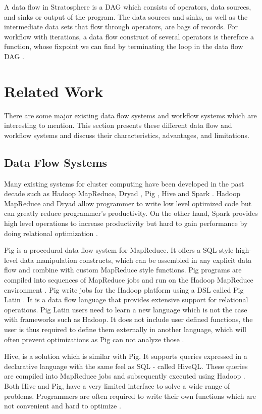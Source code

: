 A data flow in Stratosphere is a DAG which consists of operators, data sources, and sinks or output of the program. The data sources and sinks, as well as the intermediate data sets that flow through operators, are bags of records. For workflow with iterations, a data flow construct of several operators is therefore a function, whose fixpoint we can find by terminating the loop in the data flow DAG \cite{ewen2012spinning}.

\section{Related Work}\label{sec:rw}
There are some major existing data flow systems and workflow systems which are interesting to mention. This section presents these different data flow and workflow systems and discuss their characteristics, advantages, and limitations. 

\subsection{Data Flow Systems}
Many existing systems for cluster computing have been developed in the past decade such as Hadoop MapReduce, Dryad \cite{isard2007dryad}, Pig \cite{olston2008pig}, Hive \cite{thusoo2010hive} and Spark \cite{zaharia2010spark}. Hadoop MapReduce and Dryad allow programmer to write low level optimized code but can greatly reduce programmer’s productivity. On the other hand, Spark provides high level operations to increase productivity but hard to gain performance by doing relational optimization \cite{ackermann2012jet}. 

Pig is a procedural data flow system for MapReduce. It offers a SQL-style high-level data manipulation constructs, which can be assembled in any explicit data flow and combine with custom MapReduce style functions. Pig programs are compiled into sequences of MapReduce jobs and run on the Hadoop MapReduce environment \cite{gates2009building}. Pig write jobs for the Hadoop platform using a DSL called Pig Latin \cite{olston2008pig}. It is a data flow language that provides extensive support for relational operations. Pig Latin users need to learn a new language which is not the case with frameworks such as Hadoop. It does not include user defined functions, the user is thus required to define them externally in another language, which will often prevent optimizations as Pig can not analyze those \cite{ackermann2012jet}. 

Hive, is a solution which is similar with Pig. It supports queries expressed in a declarative language with the same feel as SQL - called HiveQL. These queries are compiled into MapReduce jobs and subsequently executed using Hadoop \cite{thusoo2010hive}. Both Hive and Pig, have a very limited interface to solve a wide range of problems. Programmers are often required to write their own functions which are not convenient and hard to optimize \cite{ackermann2012jet}. 

